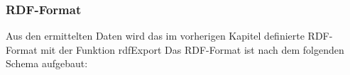 \documentclass[pagesize=auto, titlepage=on]{scrartcl}
\begin{document}
\subsubsection{RDF-Format}
Aus den ermittelten Daten wird das im vorherigen Kapitel definierte RDF-Format mit der Funktion rdfExport
Das RDF-Format ist nach dem folgenden Schema aufgebaut:

\end{document}

